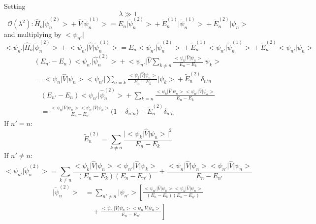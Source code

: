 \documentclass[12pt]{article}
\begin{document}
Setting  $$\lambda \gg 1$$
\begin{equation*}
	\mathcal{O}(\lambda ^2): \hat{H}_o \big|\tilde{\psi}^{(2)}_n\big> + \hat{V}\big|\tilde{\psi}^{(1)}_n\big>
	= E_n \big|\tilde{\psi}^{(2)}_n \big> + \tilde{E}^{(1)}_n \big|\tilde{\psi}^{(1)}_n \big>
	+ \tilde{E}^{(2)}_n \big| \psi_n \big>
\end{equation*}
and multiplying by $\big< \psi_{n'} \big|$
\begin{equation*}
	\big< \psi_{n'} \big|\hat{H}_o \big|\tilde{\psi}^{(2)}_n\big> + 
	\big< \psi_{n'} \big|\hat{V}\big|\tilde{\psi}^{(1)}_n\big>
	= E_n \big< \psi_{n'} \big|\tilde{\psi}^{(2)}_n \big> + 
	\tilde{E}^{(1)}_n \big< \psi_{n'} \big|\tilde{\psi}^{(1)}_n \big>
	+ \tilde{E}^{(2)}_n \big< \psi_{n'} \big| \psi_n \big>	
\end{equation*}
\begin{multline*}
	(E_{n'} - E_n)	\big< \psi_{n'} \big| \hat{\psi}^{(2)}_n \big> + \big<\psi_{n'} \big|
	\hat{V} \sum_{k\neq n} \frac{\big< \psi_k \big| \hat{V} \big| \psi_n \big>}{E_n - E_k}
	\big|\psi_k \big>\\
	= \big<\psi_n \big| \hat{V}\big| \psi_n\big>\big<\psi_{n'}\big|\sum_{n=k}\frac{\big<\psi_k\big|
	\hat{V}\big|\psi_n\big>}{E_n - E_k}\big|\psi_k\big> + \tilde{E}^{(2)}_n \delta_{n'n} 
\end{multline*}
\begin{multline*}
	(E_{n'} - E_n)	\big< \psi_{n'} \big| \hat{\psi}^{(2)}_n \big> +
	\sum_{k=n} \frac{\big<\psi_k\big|\hat{V}\big|\psi_n\big>\big<\psi_{n'}\big|\hat{V}\big|\psi_k\big>}
	{E_n - E_k}\\
	= \frac{\big<\psi_n\big|\hat{V}\big|\psi_n\big>\big<\psi_{n'}\big|\hat{V}\big|\psi_n\big>}
	{E_n - E_{n'}}\bigg(1-\delta_{n'n}\bigg) + \tilde{E}^{(2)}_n \delta_{n'n}
\end{multline*}
If $n' = n$:
\begin{equation}
	\boxed{\tilde{E}^{(2)}_n = \sum_{k\neq n} \frac{\big|\big<\psi_k\big|\hat{V}\big|\psi_n\big>\big|^2}
	{E_n - E_k}}
\end{equation}
If $n' \neq n$:
\begin{equation}
  \boxed{\big<\psi_{n'}\big|\tilde{\psi}^{(2)}_n \big> = \sum_{k\neq n} \frac{\big<\psi_k\big|\hat{V}\big|
	\psi_n\big>\big<\psi_{n'}\big|\hat{V}\big|\psi_{k}\big>}{(E_n - E_k)(E_n - E_{n'})} + 
	\frac{\big<\psi_n\big|\hat{V}\big|\psi_n\big>\big<\psi_{n'}\big|\hat{V}\big|\psi_n\big>}
  {E_n - E_{n'}}}
\end{equation}
\begin{align}
  \big|\tilde{\psi}^{(2)}_n \big> &= \sum_{n'\neq n} \bigg| \psi_{n'}\bigg> \left[\frac{\big<\psi_{n'}\big|
	\hat{V}\big|\psi_k\big>\big<\psi_k\big|\hat{V}\big|\psi_n\big>}{(E_n - E_k)(E_n-E_{n'})}
	\right.\nonumber\\ 
  & \left.\quad +\frac{\big<\psi_{n'}\big|\hat{V}\big|\psi_n\big>\big<\psi_n|\hat{V}\big|\psi_n\big>}
  {E_n - E_{n'}}\right] 
\end{align}
\end{document}
